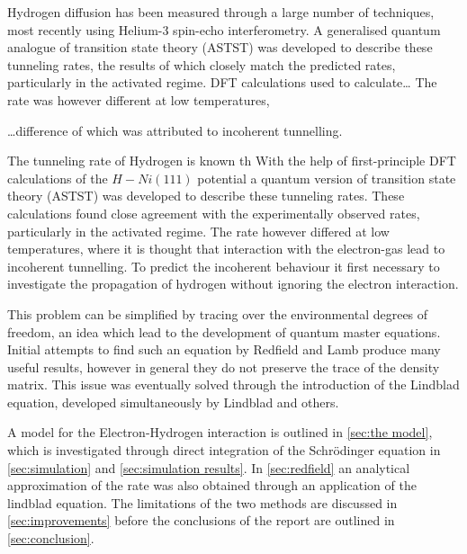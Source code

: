 Hydrogen diffusion has been measured
through a large number of
techniques\cite{LIN199141, Ni_Diffusion_Experement},
most recently
using Helium-3 spin-echo
interferometry\cite{Helium_spin_echo}. A
generalised quantum analogue of transition
state theory (ASTST) was developed to
describe these tunneling rates,
the results of which closely match the
predicted rates, particularly
in the activated regime\cite{Jianding-Zhu}.
DFT calculations used to calculate\ldots
The rate was however different at low temperatures,

\ldots difference
of which was attributed to incoherent tunnelling.


The tunneling rate of Hydrogen
is known th
With the help of first-principle DFT calculations of
the \(H-Ni(111)\) potential a
quantum version of transition state theory (ASTST)
was developed to describe these tunneling rates\cite{Jianding-Zhu}.
These calculations
found close agreement with the
experimentally observed rates, particularly
in the activated regime\cite{Jianding-Zhu}.
The rate however differed at low temperatures,
where it is thought that interaction with the
electron-gas lead to incoherent tunnelling.
To predict the incoherent behaviour
it first necessary to investigate
the propagation of hydrogen
without ignoring the electron interaction.

This problem can be
simplified by tracing over the
environmental degrees of
freedom, an idea which lead to the
development of quantum master
equations. Initial
attempts to find such an
equation by Redfield\cite{REDFIELD19651}
and Lamb\cite{PhysRev.134.A1429} produce
many useful results, however in
general they do not preserve the
trace of the density matrix. This
issue was eventually solved through
the introduction of the
Lindblad equation, developed
simultaneously by Lindblad\cite{Lindblad1976}
and others\cite{doi:10.1063/1.522979}.

A model for the Electron-Hydrogen
interaction is outlined in \cref{sec:the model},
which is investigated through
direct integration of the
Schrödinger equation in
\cref{sec:simulation}
and \cref{sec:simulation results}.
In \cref{sec:redfield} an
analytical approximation
of the rate was also obtained
through an application
of the lindblad equation.
The limitations of the two methods
are discussed in \cref{sec:improvements}
before the conclusions of
the report are outlined in \cref{sec:conclusion}.




